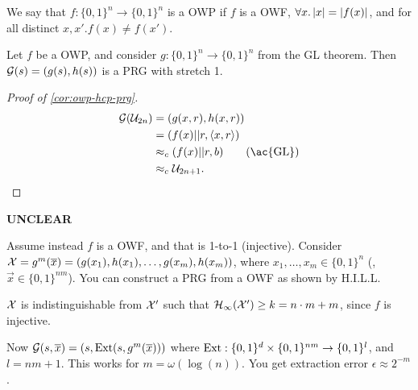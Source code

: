 \begin{definition}
	We say that $f : \{0,1\}^n \to \{0,1\}^{n}$ is a \ac{OWP} if $f$ is a \ac{OWF}, $\forall x . \left|{x}\right| = \left|{f(x)}\right|$, and for all distinct $x, x' . f(x) \neq f(x')$.
\end{definition}

\begin{corollary} \label{cor:owp-hcp-prg}
	Let $f$ be a \ac{OWP}, and consider $g : \{0,1\}^n \to \{0,1\}^{n}$ from the \ac{GL} theorem.
	Then $\mathcal{G}(s) = (g(s), h(s))$ is a \ac{PRG} with stretch 1.
\end{corollary}

\begin{proof}[Proof of \cref{cor:owp-hcp-prg}]
	\begin{align*}
		\G(\U_{2n})
		& =
		(g(x,r), h(x,r)) \\
		& =
		(f(x) || r, \DotProduct{x}{r}) \\
		& \CompInd 
		(f(x) || r, b) \tag{\ac{GL}}
		\\
		& \CompInd
		\U_{2n+1}.
	\end{align*}
\end{proof}


{\bfseries UNCLEAR}

Assume instead $f$ is a \ac{OWF}, and that is 1-to-1 (injective).
Consider $\mathcal{X} = g^m(\overline{x}) = (g(x_1), h(x_1), \dots, g(x_m), h(x_m))$, where $x_1, \dots, x_m \in \{0,1\}^{n}$ (\ie, $\vec{x} \in \{0,1\}^{nm}$).
You can construct a \ac{PRG} from a \ac{OWF} as shown by H.I.L.L.

\begin{fact}
$\mathcal{X}$ is indistinguishable from $\mathcal{X}'$ such that $\mathcal{H}_{\infty}(\mathcal{X}') \ge k = n \cdot m + m$, since $f$ is injective.
\end{fact}

Now $\mathcal{G}(s, \overline{x}) = (s, \mathrm{Ext}(s, g^{m}(\overline{x})))$ where $\mathrm{Ext} : \{0,1\}^{d} \times \{0,1\}^{nm} \to \{0,1\}^{l}$, and $l = nm + 1$.
This works for $m = \omega(\log(n))$.
You get extraction error $\epsilon \approx 2^{-m}$.

